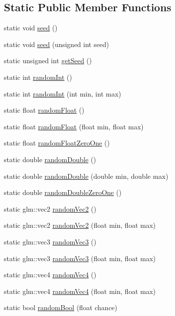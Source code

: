 \subsection*{Static Public Member Functions}
\begin{DoxyCompactItemize}
\item 
static void \mbox{\hyperlink{classutl_1_1_random_a49284e0d91bf8f039b03d811e848821f}{seed}} ()
\item 
static void \mbox{\hyperlink{classutl_1_1_random_ac91fc644c7437c700f2c1addeb65125a}{seed}} (unsigned int seed)
\item 
static unsigned int \mbox{\hyperlink{classutl_1_1_random_a88abb8994dd315ddc0d44707752f4150}{get\+Seed}} ()
\item 
static int \mbox{\hyperlink{classutl_1_1_random_a4d2a67cf40ac693462c15bad1c0c8690}{random\+Int}} ()
\item 
static int \mbox{\hyperlink{classutl_1_1_random_a61dc7caa999d944c517a9dac8facaab3}{random\+Int}} (int min, int max)
\item 
static float \mbox{\hyperlink{classutl_1_1_random_a632e5c126ef9a6c795aacc808b730aa7}{random\+Float}} ()
\item 
static float \mbox{\hyperlink{classutl_1_1_random_aade7c16ed40c5ece2306fbcd767029ca}{random\+Float}} (float min, float max)
\item 
static float \mbox{\hyperlink{classutl_1_1_random_ad9fa44ac9bcec4e1d906ed6c635dd26b}{random\+Float\+Zero\+One}} ()
\item 
static double \mbox{\hyperlink{classutl_1_1_random_a984348e7f72f1e6f57de11ac984c4544}{random\+Double}} ()
\item 
static double \mbox{\hyperlink{classutl_1_1_random_a761a64b397ebccb5c0d4dd67ddd7be1d}{random\+Double}} (double min, double max)
\item 
static double \mbox{\hyperlink{classutl_1_1_random_ad6d9143574a3f5bdcd20241bc251101d}{random\+Double\+Zero\+One}} ()
\item 
static glm\+::vec2 \mbox{\hyperlink{classutl_1_1_random_ac9078b280a84048158127532cbcb0e43}{random\+Vec2}} ()
\item 
static glm\+::vec2 \mbox{\hyperlink{classutl_1_1_random_a00632573896ef61e7ba0fdcedcdf3266}{random\+Vec2}} (float min, float max)
\item 
static glm\+::vec3 \mbox{\hyperlink{classutl_1_1_random_a6e2aaa6b6117cfe92312af1153adc808}{random\+Vec3}} ()
\item 
static glm\+::vec3 \mbox{\hyperlink{classutl_1_1_random_ae52ea617bc38ca85a9eb4cdc029b371c}{random\+Vec3}} (float min, float max)
\item 
static glm\+::vec4 \mbox{\hyperlink{classutl_1_1_random_abab1cbc6931823c0449b53210292527f}{random\+Vec4}} ()
\item 
static glm\+::vec4 \mbox{\hyperlink{classutl_1_1_random_a38f60c4bd2fca40f4392672d3876b17a}{random\+Vec4}} (float min, float max)
\item 
static bool \mbox{\hyperlink{classutl_1_1_random_a946070e88d52bb580038257acfe81b1c}{random\+Bool}} (float chance)
\end{DoxyCompactItemize}


